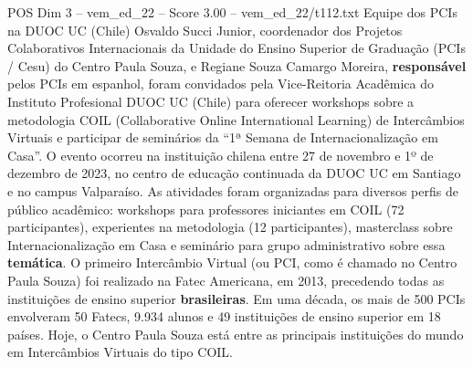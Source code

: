 \begin{textsample}{POS Dim 3 – vem\_ed\_22 – Score 3.00 – vem\_ed\_22/t112.txt}  \label{ex:f3_pos_167}
Equipe dos PCIs na DUOC UC (Chile) Osvaldo Succi Junior, coordenador dos Projetos Colaborativos Internacionais da Unidade do Ensino Superior de Graduação (PCIs / Cesu) do Centro Paula Souza, e Regiane Souza Camargo Moreira, \textbf{responsável} pelos PCIs em espanhol, foram convidados pela Vice-Reitoria Acadêmica do Instituto Profesional DUOC UC (Chile) para oferecer workshops sobre a metodologia COIL (Collaborative Online International Learning) de Intercâmbios Virtuais e participar de seminários da “1ª Semana de Internacionalização em Casa”.
O evento ocorreu na instituição chilena entre 27 de novembro e 1º de dezembro de 2023, no centro de educação continuada da DUOC UC em Santiago e no campus Valparaíso.
As atividades foram organizadas para diversos perfis de público acadêmico: workshops para professores iniciantes em COIL (72 participantes), experientes na metodologia (12 participantes), masterclass sobre Internacionalização em Casa e seminário para grupo administrativo sobre essa \textbf{temática}.
O primeiro Intercâmbio Virtual (ou PCI, como é chamado no Centro Paula Souza) foi realizado na Fatec Americana, em 2013, precedendo todas as instituições de ensino superior \textbf{brasileiras}.
Em uma década, os mais de 500 PCIs envolveram 50 Fatecs, 9.934 alunos e 49 instituições de ensino superior em 18 países.
Hoje, o Centro Paula Souza está entre as principais instituições do mundo em Intercâmbios Virtuais do tipo COIL.

\end{textsample}
